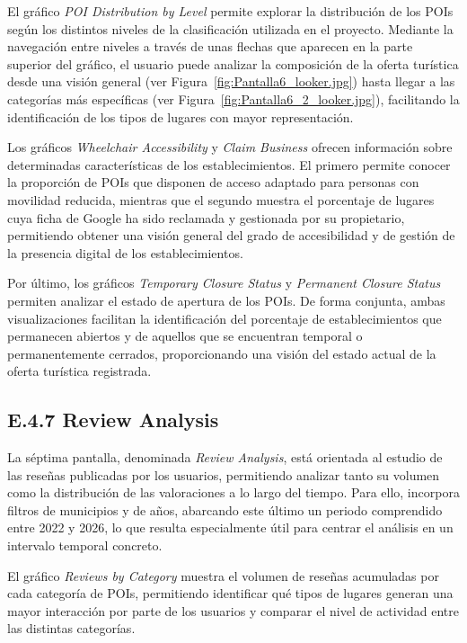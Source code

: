El gráfico \textit{POI Distribution by Level} permite explorar la distribución de los POIs según los distintos niveles de la clasificación utilizada en el proyecto. Mediante la navegación entre niveles a través de unas flechas que aparecen en la parte superior del gráfico, el usuario puede analizar la composición de la oferta turística desde una visión general (ver Figura~\ref{fig:Pantalla6_looker.jpg}) hasta llegar a las categorías más específicas (ver Figura~\ref{fig:Pantalla6_2_looker.jpg}), facilitando la identificación de los tipos de lugares con mayor representación.

Los gráficos \textit{Wheelchair Accessibility} y \textit{Claim Business} ofrecen información sobre determinadas características de los establecimientos. El primero permite conocer la proporción de POIs que disponen de acceso adaptado para personas con movilidad reducida, mientras que el segundo muestra el porcentaje de lugares cuya ficha de Google ha sido reclamada y gestionada por su propietario, permitiendo obtener una visión general del grado de accesibilidad y de gestión de la presencia digital de los establecimientos.

Por último, los gráficos \textit{Temporary Closure Status} y \textit{Permanent Closure Status} permiten analizar el estado de apertura de los POIs. De forma conjunta, ambas visualizaciones facilitan la identificación del porcentaje de establecimientos que permanecen abiertos y de aquellos que se encuentran temporal o permanentemente cerrados, proporcionando una visión del estado actual de la oferta turística registrada.


\subsection{E.4.7 Review Analysis}
La séptima pantalla, denominada \textit{Review Analysis}, está orientada al estudio de las reseñas publicadas por los usuarios, permitiendo analizar tanto su volumen como la distribución de las valoraciones a lo largo del tiempo. Para ello, incorpora filtros de municipios y de años, abarcando este último un periodo comprendido entre 2022 y 2026, lo que resulta especialmente útil para centrar el análisis en un intervalo temporal concreto.

El gráfico \textit{Reviews by Category} muestra el volumen de reseñas acumuladas por cada categoría de POIs, permitiendo identificar qué tipos de lugares generan una mayor interacción por parte de los usuarios y comparar el nivel de actividad entre las distintas categorías.

